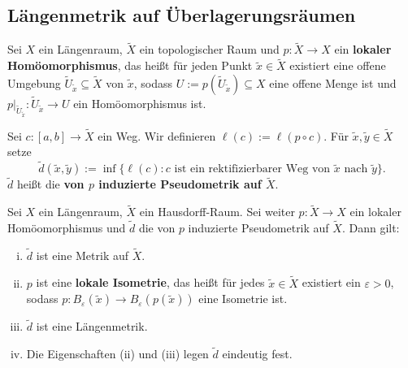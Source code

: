 \subsection{Längenmetrik auf Überlagerungsräumen}
\label{sec:2.2}

\begin{definition}
\label{def:2.23}
	Sei $X$ ein Längenraum, $\tilde{X}$ ein topologischer Raum und $p \colon \tilde{X} \rightarrow X$ ein \textbf{lokaler Homöomorphismus}, das heißt für jeden Punkt $\tilde{x} \in \tilde{X}$ existiert eine offene Umgebung $\tilde{U}_{\tilde{x}} \subseteq \tilde{X}$ von $\tilde{x}$, sodass $U := p(\tilde{U}_{\tilde{x}}) \subseteq X$ eine offene Menge ist und $p \big|_{\tilde{U}_{\tilde{x}}}\colon \tilde{U}_{\tilde{x}} \rightarrow U$ ein Homöomorphismus ist. 
	
	Sei $c \colon [a,b] \rightarrow \tilde{X}$ ein Weg.
	Wir definieren $\ell(c) := \ell(p \circ c)$.
	Für $\tilde{x}, \tilde{y} \in \tilde{X}$ setze
	\[
		\tilde{d}(\tilde{x},\tilde{y}) := \inf \{ \ell(c) : c \text{ ist ein rektifizierbarer Weg von } \tilde{x} \text{ nach } \tilde{y}\}.
	\]
	$\tilde{d}$ heißt die \textbf{von $p$ induzierte Pseudometrik auf $\tilde{X}$}. 
\end{definition}

\begin{satz}
\label{satz:2.24}
	Sei $X$ ein Längenraum, $\tilde{X}$ ein Hausdorff-Raum.
	Sei weiter $p \colon \tilde{X} \rightarrow X$ ein lokaler Homöomorphismus und $\tilde{d}$ die von $p$ induzierte Pseudometrik auf $\tilde{X}$.
	Dann gilt:
	\begin{enumerate}[(i)]
		\item $\tilde{d}$ ist eine Metrik auf $\tilde{X}$.
		\item $p$ ist eine \textbf{lokale Isometrie}, das heißt für jedes $\tilde{x} \in \tilde{X}$ existiert ein $\varepsilon > 0$, sodass $p \colon B_\varepsilon(\tilde{x}) \rightarrow B_\varepsilon(p(\tilde{x}))$ eine Isometrie ist. 
		\item $\tilde{d}$ ist eine Längenmetrik.
		\item Die Eigenschaften (ii) und (iii) legen $\tilde{d}$ eindeutig fest.
	\end{enumerate}
\end{satz}

